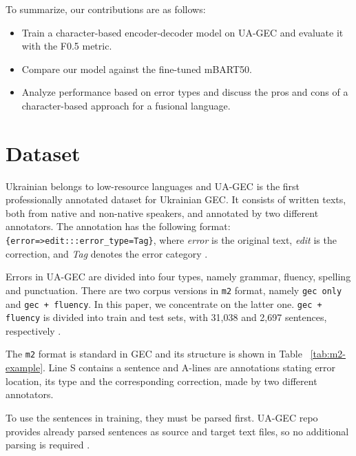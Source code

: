 \documentclass[11pt]{article}
\begin{document}
To summarize, our contributions are as follows:

\begin{itemize}
    \item  Train a character-based encoder-decoder model 
    on UA-GEC and evaluate it with the F0.5 metric.
    \item Compare our model against the fine-tuned mBART50.
    \item Analyze performance based on error types and discuss the pros and cons of a character-based approach for a 
    fusional language.
\end{itemize}

\section{Dataset}

Ukrainian belongs to low-resource languages and UA-GEC is the first professionally annotated dataset for Ukrainian GEC. It consists of written texts, both from native and non-native speakers, and annotated by two different annotators. 
The annotation has the following format: \texttt{\{error=>edit:::error\_type=Tag\}},
where \textit{error} is the original text, \textit{edit} is the correction, and \textit{Tag} denotes the error category \citep{syvokon-etal-2023-ua}.

Errors in UA-GEC are divided into four types, namely grammar, fluency, spelling and punctuation. There are two corpus versions in \texttt{m2} format, namely \texttt{gec only } and \texttt{gec + fluency}. In this paper, we concentrate on the latter one. \texttt{gec + fluency} is divided into train and test sets, with 31,038 and 2,697 sentences, respectively \citep{syvokon-etal-2023-ua}.

The \texttt{m2} format is standard in GEC and its structure is shown in Table ~\ref{tab:m2-example}. Line S contains a sentence and A-lines are annotations stating error location, its type and the corresponding correction, made by two different annotators.


\begin{table}[h]
\centering
{}
\caption{An example of a m2-formatted sentence.}
\label{tab:m2-example}
\end{table}
To use the sentences in training, they must be parsed first. UA-GEC repo provides already  parsed sentences as source and target text files, so no additional parsing is required \citep{uagec-2023}. 
\end{document}
